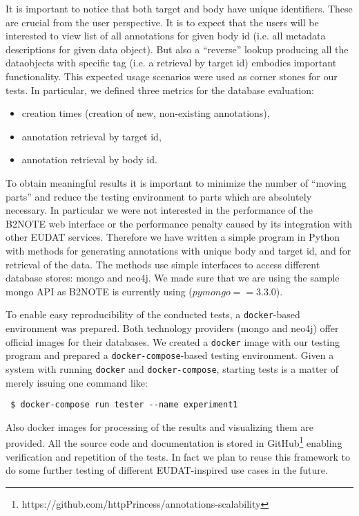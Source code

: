 \documentclass[a4paper,10pt]{article}
\begin{document}
It is important to notice that both target and body have unique identifiers. 
These are crucial from the user perspective. It is to expect that the users will 
be interested to view list of all annotations for given body id (i.e. all 
metadata descriptions for given data object). But also a ``reverse'' lookup 
producing all the dataobjects with specific tag (i.e. a retrieval by target id) 
embodies important functionality. This expected usage scenarios were used 
as corner stones for our tests. In particular, we defined three 
metrics for the database evaluation:
\begin{itemize}
 \item creation times (creation of new, non-existing annotations),
 \item annotation retrieval by target id,
 \item annotation retrieval by body id.
\end{itemize}

To obtain meaningful results it is important to minimize the number of ``moving 
parts'' and reduce the testing environment to parts which are absolutely 
necessary. In particular we were not interested in the performance of the B2NOTE 
web interface or the performance penalty caused by its integration with other EUDAT 
services. Therefore we have written a simple program in Python with methods 
for generating annotations with unique body and target id, and for retrieval
of the data. The methods use simple interfaces to access different database
stores: mongo and neo4j. We made sure that we are using the sample mongo API 
as B2NOTE is currently using ($pymongo==3.3.0$). 

To enable easy reproducibility of the conducted tests, a \texttt{docker}-based 
environment was prepared. Both technology providers (mongo and neo4j) offer 
official images for their databases. We created a \texttt{docker} image with our 
testing program and prepared a \texttt{docker-compose}-based testing 
environment. Given a system with running \texttt{docker} and 
\texttt{docker-compose}, starting tests is a matter of merely issuing one 
command like: 
\begin{verbatim}
 $ docker-compose run tester --name experiment1 
\end{verbatim}

Also docker images for processing of the results and visualizing them are 
provided. All the source code and documentation is stored in 
GitHub\footnote{https://github.com/httpPrincess/annotations-scalability} 
enabling verification and repetition of the tests. In fact we plan to 
reuse this framework to do some further testing of different EUDAT-inspired 
use cases in the future. 
\end{document}
